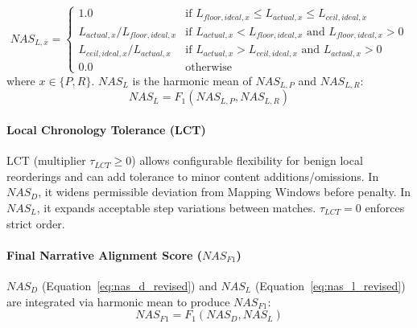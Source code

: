 \documentclass[letterpaper]{article} %
\begin{document}
\begin{equation}
\label{eq:nas_lx_revised}
NAS_{L,x} =
\begin{cases}
1.0 & \text{if } L_{floor,ideal,x} \leq L_{actual,x} \leq L_{ceil,ideal,x} \\
L_{actual,x} / L_{floor,ideal,x} & \text{if } L_{actual,x} < L_{floor,ideal,x} \text{ and } L_{floor,ideal,x} > 0 \\
L_{ceil,ideal,x} / L_{actual,x} & \text{if } L_{actual,x} > L_{ceil,ideal,x} \text{ and } L_{actual,x} > 0 \\
0.0 & \text{otherwise}
\end{cases}
\end{equation}
where $x \in \{P, R\}$. $NAS_L$ is the harmonic mean of $NAS_{L,P}$ and $NAS_{L,R}$:
\begin{equation}
\label{eq:nas_l_revised}
NAS_L = F_1(NAS_{L,P}, NAS_{L,R})
\end{equation}

\paragraph{Local Chronology Tolerance (LCT)}
\label{sssec:lct_revised}
LCT (multiplier $\tau_{LCT} \geq 0$) allows configurable flexibility for benign local reorderings and can add tolerance to minor content additions/omissions. In $NAS_D$, it widens permissible deviation from Mapping Windows before penalty. In $NAS_L$, it expands acceptable step variations between matches. $\tau_{LCT}=0$ enforces strict order.

\paragraph{Final Narrative Alignment Score ($NAS_{F1}$)}
\label{sssec:nas_f1_revised}
$NAS_D$ (Equation~\ref{eq:nas_d_revised}) and $NAS_L$ (Equation~\ref{eq:nas_l_revised}) are integrated via harmonic mean to produce $NAS_{F1}$:
\begin{equation}
\label{eq:nas_f1_revised}
NAS_{F1} = F_1(NAS_D, NAS_L)
\end{equation}
\end{document}
